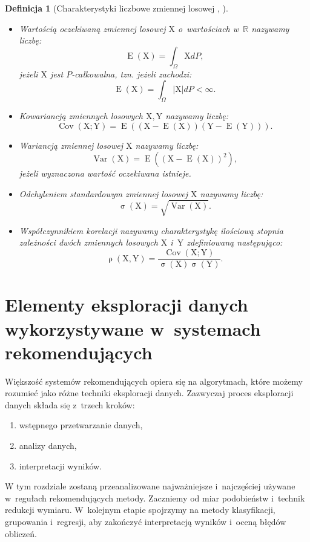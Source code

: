 \documentclass[12pt,a4paper]{report}
\newtheorem{df}{Definicja}[chapter]
\newcommand{\setR}{\mathbb{R}}
\newcommand{\ro}[2]{\operatorname{\rho}\left( {#1},{#2} \right)}
\newcommand{\Covariance}[2]{\operatorname{Cov}\left({#1}; {#2} \right)}
\newcommand{\variance}[1]{\operatorname{Var}\left({#1} \right)}
\newcommand{\e}[1]{\operatorname{E}\left({#1} \right)}
\newcommand{\standard}[1]{\operatorname{\sigma}\left({#1} \right)}
\begin{document}
\begin{df}[Charakterystyki liczbowe zmiennej losowej {\citep{jakubowski}}, {\citep{wztp}}]
${}$
\begin{itemize}
\item Wartością oczekiwaną zmiennej losowej $\mathrm{X}$ o~wartościach w~$\setR$ nazywamy liczbę:
$$
\e{\mathrm{X}} = \int_{\Omega} \mathrm{X} dP,
$$
jeżeli $\mathrm{X}$ jest $P$-całkowalna, tzn. jeżeli zachodzi:
$$
\e{\mathrm{X}} = \int_{\Omega} |\mathrm{X}| dP < \infty.
$$

\item Kowariancją zmiennych losowych $\mathrm{X},\mathrm{Y}$ nazywamy liczbę:
$$
\Covariance{\mathrm{X}}{\mathrm{Y}} = \e{(\mathrm{X}-\e{\mathrm{X}})(\mathrm{Y}-\e{\mathrm{Y}})}.
$$

\item Wariancją zmiennej losowej $\mathrm{X}$ nazywamy liczbę:
$$
\variance{\mathrm{X}}=\e{(\mathrm{X}-\e{\mathrm{X}})^2},
$$
jeżeli wyznaczona wartość oczekiwana istnieje.

\item Odchyleniem standardowym zmiennej losowej $\mathrm{X}$ nazywamy liczbę:
$$
\standard{\mathrm{X}}=\sqrt{\variance{\mathrm{X}}}.
$$

\item Współczynnikiem korelacji nazywamy charakterystykę ilościową stopnia zależności dwóch zmiennych losowych $\mathrm{X}$ i~$\mathrm{Y}$ zdefiniowaną następująco:
$$
\ro{\mathrm{X}}{\mathrm{Y}} = \frac{\Covariance{\mathrm{X}}{\mathrm{Y}}}{\standard{\mathrm{X}} \standard{\mathrm{Y}}}.
$$

\end{itemize}
\end{df}



\chapter{Elementy eksploracji danych wykorzystywane w~systemach rekomendujących}
Większość systemów rekomendujących opiera się na algorytmach, które możemy rozumieć jako różne techniki eksploracji danych. 
Zazwyczaj proces eksploracji danych składa się z~trzech kroków:
\begin{enumerate}
\item wstępnego przetwarzanie danych,
\item analizy danych,
\item interpretacji wyników.
\end{enumerate}
W tym rozdziale zostaną przeanalizowane najważniejsze i~najczęściej używane w~regułach rekomendujących metody. Zaczniemy od miar podobieństw i~technik redukcji wymiaru. W~kolejnym etapie spojrzymy na metody klasyfikacji, grupowania i~regresji, aby zakończyć interpretacją wyników i~oceną błędów obliczeń.
\end{document}
